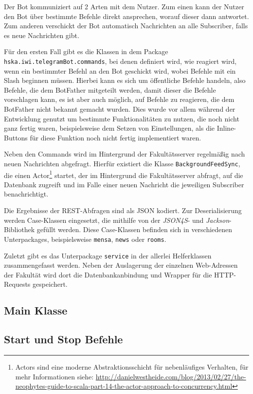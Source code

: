Der Bot kommuniziert auf 2 Arten mit dem Nutzer. Zum einen kann der Nutzer den Bot über bestimmte Befehle direkt ansprechen, worauf dieser dann antwortet. Zum anderen verschickt der Bot automatisch Nachrichten an alle Subscriber, falls es neue Nachrichten gibt.

Für den ersten Fall gibt es die Klassen in dem Package \texttt{hska\allowbreak.iwi\allowbreak.telegramBot\allowbreak.commands}, bei denen definiert wird, wie reagiert wird, wenn ein bestimmter Befehl an den Bot geschickt wird, wobei Befehle mit ein Slash beginnen müssen. Hierbei kann es sich um öffentliche Befehle handeln, also Befehle, die dem BotFather mitgeteilt werden, damit dieser die Befehle vorschlagen kann, es ist aber auch möglich, auf Befehle zu reagieren, die dem BotFather nicht bekannt gemacht wurden. Dies wurde vor allem während der Entwicklung genutzt um bestimmte Funktionalitäten zu nutzen, die noch nicht ganz fertig waren, beispielsweise dem Setzen von Einstellungen, als die Inline-Buttons für diese Funktion noch nicht fertig implementiert waren.

Neben den Commands wird im Hintergrund der Fakultätsserver regelmäßig nach neuen Nachrichten abgefragt. Hierfür existiert die Klasse \texttt{BackgroundFeedSync}, die einen Actor\footnote{Actors sind eine moderne Abstraktionsschicht für nebenläufiges Verhalten, für mehr Informationen siehe: \url{http://danielwestheide.com/blog/2013/02/27/the-neophytes-guide-to-scala-part-14-the-actor-approach-to-concurrency.html}} startet, der im Hintergrund die Fakultätsserver abfragt, auf die Datenbank zugreift und im Falle einer neuen Nachricht die jeweiligen Subscriber benachrichtigt.

Die Ergebnisse der REST-Abfragen sind als JSON kodiert. Zur Deserialisierung werden Case-Klassen eingesetzt, die mithilfe von der \emph{JSON4S}- und \emph{Jackson}-Bibliothek gefüllt werden. Diese Case-Klassen befinden sich in verschiedenen Unterpackages, beispielsweise \texttt{mensa}, \texttt{news} oder \texttt{rooms}.

Zuletzt gibt es das Unterpackage \texttt{service} in der allerlei Helferklassen zusammengefasst werden. Neben der Auslagerung der einzelnen Web-Adressen der Fakultät wird dort die Datenbankanbindung und Wrapper für die HTTP-Requests gespeichert.

\subsection{Main Klasse}\label{sec:Programmstart}

\subsection{Start und Stop Befehle}\label{sec:StartStopCommands}
